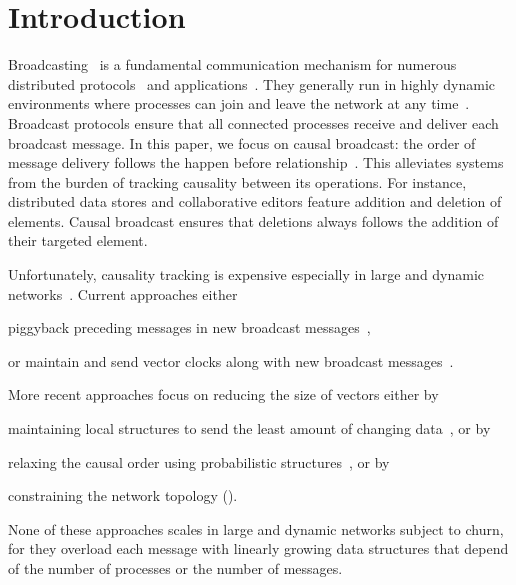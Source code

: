 
\section{Introduction}


Broadcasting~\cite{hadzilacos1994modular} is a fundamental communication
mechanism for numerous distributed
protocols~\cite{nakamoto2009bitcoin,shapiro2011comprehensive} and
applications~\cite{nedelec2016crate}. They generally run in highly dynamic
environments where processes can join and leave the network at any
time~\cite{mostefaoui2005static}. Broadcast protocols ensure that all connected
processes receive and deliver each broadcast message.
In this paper, we focus on causal broadcast: the order of message delivery
follows the happen before
relationship~\cite{lamport1978time,schwarz1994detecting}. This alleviates
systems from the burden of tracking causality between its operations.  For
instance, distributed data stores and collaborative editors feature addition and
deletion of elements. Causal broadcast ensures that deletions always follows the
addition of their targeted element.


Unfortunately, causality tracking is expensive especially in large and dynamic
networks~\cite{charronbost1991concerning}. Current approaches either
\begin{inparaenum}[(i)]
\item piggyback preceding messages in new broadcast
  messages~\cite{birman1987reliable,hadzilacos1993fault},
\item or maintain and send vector clocks along with new broadcast
  messages~\cite{fidge1988timestamps,mattern1989virtual}.
\end{inparaenum}
More recent approaches focus on reducing the size of vectors either by
\begin{inparaenum}[(a)]
\item maintaining local structures to send the least amount of changing
  data~\cite{singhal1992efficient}, or by
\item relaxing the causal order using probabilistic
  structures~\cite{mostefaoui2017probabilistic}, or by
\item constraining the network topology (\REF).
\end{inparaenum}
None of these approaches scales in large and dynamic networks subject to churn,
for they overload each message with linearly growing data structures that depend
of the number of processes or the number of messages.

